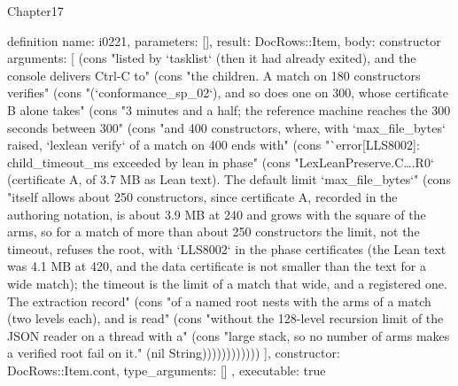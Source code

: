 \begin{lexlean}{Chapter17}
\begin{semanticmodule}
definition{
  name: i0221,
  parameters: [],
  result: DocRows::Item,
  body: constructor{
    arguments: [
      (cons "listed by `tasklist` (then it had already exited), and the console delivers Ctrl-C to" (cons "the children. A match on 180 constructors verifies" (cons "(`conformance_sp_02`), and so does one on 300, whose certificate B alone takes" (cons "3 minutes and a half; the reference machine reaches the 300 seconds between 300" (cons "and 400 constructors, where, with `max_file_bytes` raised, `lexlean verify` of a match on 400 ends with" (cons "`error[LLS8002]: child_timeout_ms exceeded by lean in phase" (cons "LexLeanPreserve.C….R0` (certificate A, of 3.7 MB as Lean text). The default limit `max_file_bytes`" (cons "itself allows about 250 constructors, since certificate A, recorded in the authoring notation, is about 3.9 MB at 240 and grows with the square of the arms, so for a match of more than about 250 constructors the limit, not the timeout, refuses the root, with `LLS8002` in the phase certificates (the Lean text was 4.1 MB at 420, and the data certificate is not smaller than the text for a wide match); the timeout is the limit of a match that wide, and a registered one. The extraction record" (cons "of a named root nests with the arms of a match (two levels each), and is read" (cons "without the 128-level recursion limit of the JSON reader on a thread with a" (cons "large stack, so no number of arms makes a verified root fail on it." (nil String))))))))))))
    ],
    constructor: DocRows::Item.cont,
    type_arguments: []
  },
  executable: true
}


\end{semanticmodule}
\end{lexlean}
